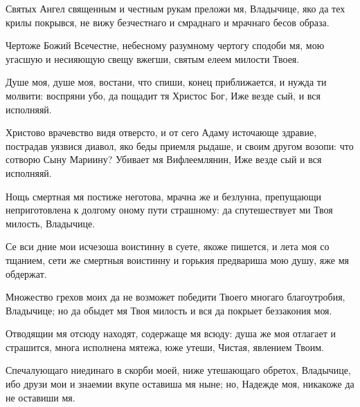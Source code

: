 \begin{mymulticols}
Святых Ангел священным и честным рукам преложи мя, Владычице, яко да тех крилы покрывся, не вижу безчестнаго и смраднаго и мрачнаго бесов образа.

\inyne

 Чертоже Божий Всечестне, небесному разумному чертогу сподоби мя, мою угасшую и несияющую свещу вжегши, святым елеем милости Твоея.


Душе моя, душе моя, востани, что спиши, конец приближается, и нужда ти молвити: воспряни убо, да пощадит тя Христос Бог, Иже везде сый, и вся исполняяй.


Христово врачевство видя отверсто, и от сего Адаму источающе здравие, пострадав уязвися диавол, яко беды приемля рыдаше, и своим другом возопи: что сотворю Сыну Мариину? Убивает мя Вифлеемлянин, Иже везде сый и вся исполняяй.




Нощь смертная мя постиже неготова, мрачна же и безлунна, препущающи неприготовлена к долгому оному пути страшному: да спутешествует ми Твоя милость, Владычице.


Се вси дние мои исчезоша воистинну в суете, якоже пишется, и лета моя со тщанием, сети же смертныя воистинну и горькия предвариша мою душу, яже мя обдержат.


Множество грехов моих да не возможет победити Твоего многаго благоутробия, Владычице; но да обыдет мя Твоя милость и вся да покрыет беззакония моя.

\slava

Отводящии мя отсюду находят, содержаще мя всюду: душа же моя отлагает и страшится, многа исполнена мятежа, юже утеши, Чистая, явлением Твоим.

\inyne

 Спечалующаго ниединаго в скорби моей, ниже утешающаго обретох, Владычице, ибо друзи мои и знаемии вкупе оставиша мя ныне; но, Надежде моя, никакоже да не оставиши мя.



\end{mymulticols}
